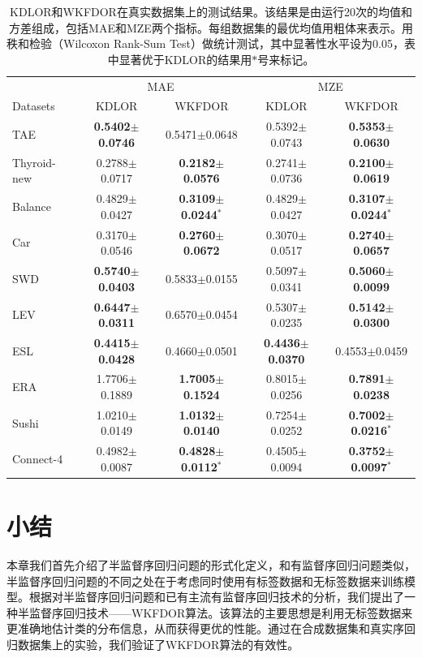 \begin{table}[!h]
\caption{KDLOR和WKFDOR在真实数据集上的测试结果。该结果是由运行20次的均值和方差组成，包括MAE和MZE两个指标。每组数据集的最优均值用粗体来表示。用秩和检验（Wilcoxon Rank-Sum Test）做统计测试，其中显著性水平设为0.05，表中显著优于KDLOR的结果用$*$号来标记。}
\label{table_realResults20m}
\centering
\begin{tabular}{l|cc|cc}
\toprule
 & \multicolumn {2}{c|}{MAE} & \multicolumn {2}{c}{MZE} \\
 \cmidrule {2-5}
Datasets & KDLOR & WKFDOR & KDLOR & WKFDOR\\
\midrule
TAE &  {\bf 0.5402$\pm$0.0746} &  0.5471$\pm$0.0648 & 0.5392$\pm$0.0743 & {\bf 0.5353$\pm$0.0630} \\
Thyroid-new & 0.2788$\pm$0.0717 &  {\bf 0.2182$\pm$0.0576} & 0.2741$\pm$0.0736 & {\bf 0.2100$\pm$0.0619} \\
Balance & 0.4829$\pm$0.0427 &  {\bf 0.3109$\pm$0.0244}$^{*}$ & 0.4829$\pm$0.0427 & {\bf 0.3107$\pm$0.0244}$^{*}$ \\
Car & 0.3170$\pm$0.0546 &  {\bf 0.2760$\pm$0.0672} & 0.3070$\pm$0.0517 & {\bf 0.2740$\pm$0.0657} \\
SWD & {\bf 0.5740$\pm$0.0403} &  0.5833$\pm$0.0155 & 0.5097$\pm$0.0341 & {\bf 0.5060$\pm$0.0099} \\
LEV & {\bf 0.6447$\pm$0.0311} &  0.6570$\pm$0.0454 & 0.5307$\pm$0.0235 & {\bf 0.5142$\pm$0.0300} \\
ESL & {\bf 0.4415$\pm$0.0428} &  0.4660$\pm$0.0501 & {\bf 0.4436$\pm$0.0370} & 0.4553$\pm$0.0459 \\
ERA & 1.7706$\pm$0.1889 &  {\bf 1.7005$\pm$0.1524} & 0.8015$\pm$0.0256 & {\bf 0.7891$\pm$0.0238} \\
Sushi & 1.0210$\pm$0.0149 & {\bf 1.0132$\pm$0.0140} & 0.7254$\pm$0.0252 & {\bf 0.7002$\pm$0.0216}$^{*}$ \\
Connect-4 & 0.4982$\pm$0.0087 & {\bf 0.4828$\pm$0.0112}$^{*}$ & 0.4505$\pm$0.0094 & {\bf 0.3752$\pm$0.0097}$^{*}$ \\
\bottomrule
\end{tabular}
\end{table}

\section{小结}
本章我们首先介绍了半监督序回归问题的形式化定义，和有监督序回归问题类似，半监督序回归问题的不同之处在于考虑同时使用有标签数据和无标签数据来训练模型。根据对半监督序回归问题和已有主流有监督序回归技术的分析，我们提出了一种半监督序回归技术——WKFDOR算法。该算法的主要思想是利用无标签数据来更准确地估计类的分布信息，从而获得更优的性能。通过在合成数据集和真实序回归数据集上的实验，我们验证了WKFDOR算法的有效性。









